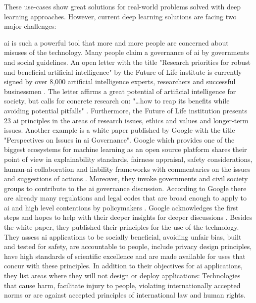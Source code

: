 These use-cases show great solutions for real-world problems solved with deep learning approaches.
However, current deep learning solutions are facing two major challenges:

\acrshort{ai} is such a powerful tool that more and more people are concerned about misuses of the technology.
Many people claim a governance of \acrshort{ai} by governments and social guidelines.
An open letter with the title "Research priorities for robust and beneficial artificial intelligence" by the Future of Life institute is currently signed by over 8,000 artificial intelligence experts, researchers and successful businessmen \cite{futureoflife-ai-open-letter, futureoflife-research-priorities}.
The letter affirms a great potential of artificial intelligence for society, but calls for concrete research on: "…how to reap its benefits while avoiding potential pitfalls" \cite{futureoflife-ai-open-letter}.
Furthermore, the Future of Life institution presents 23 \acrshort{ai} principles in the areas of research issues, ethics and values and longer-term issues. \cite{futureoflife-ai-principles}
\hfill \break
Another example is a white paper published by Google with the title "Perspectives on Issues in \acrshort{ai} Governance".
Google which provides one of the biggest ecosystems for machine learning as an open source platform shares their point of view in explainability standards, fairness appraisal, safety considerations, human-\acrshort{ai} collaboration and liability frameworks with commentaries on the issues and suggestions of actions \cite{google-ai-governance}.
Moreover, they invoke governments and civil society groups to contribute to the \acrshort{ai} governance discussion.
According to Google there are already many regulations and legal codes that are broad enough to apply to \acrshort{ai} and high level contentions by policymakers \cite[page 3]{google-ai-governance}.
Google acknowledges the first steps and hopes to help with their deeper insights for deeper discussions \cite[page 4]{google-ai-governance}.
\hfill \break
Besides the white paper, they published their principles for the use of the technology.
They assess \acrshort{ai} applications to be socially beneficial, avoiding unfair bias, built and tested for safety, are accountable to people, include privacy design principles, have high standards of scientific excellence and are made available for uses that concur with these principles.
In addition to their objectives for \acrshort{ai} applications, they list areas where they will not design or deploy applications:
Technologies that cause harm, facilitate injury to people, violating internationally accepted norms or are against accepted principles of international law and human rights.
